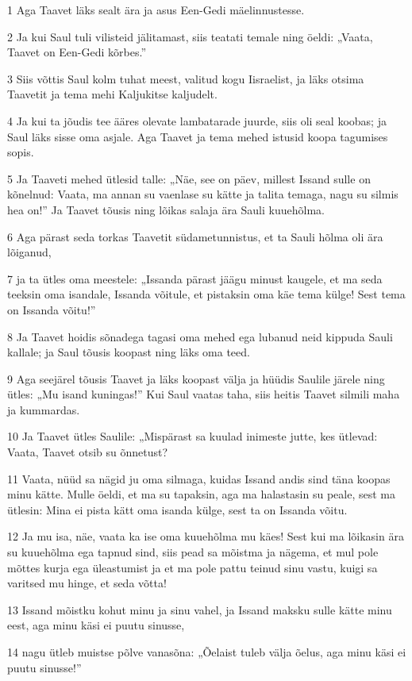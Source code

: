 \par 1 Aga Taavet läks sealt ära ja asus Een-Gedi mäelinnustesse.
\par 2 Ja kui Saul tuli vilisteid jälitamast, siis teatati temale ning öeldi: „Vaata, Taavet on Een-Gedi kõrbes.”
\par 3 Siis võttis Saul kolm tuhat meest, valitud kogu Iisraelist, ja läks otsima Taavetit ja tema mehi Kaljukitse kaljudelt.
\par 4 Ja kui ta jõudis tee ääres olevate lambatarade juurde, siis oli seal koobas; ja Saul läks sisse oma asjale. Aga Taavet ja tema mehed istusid koopa tagumises sopis.
\par 5 Ja Taaveti mehed ütlesid talle: „Näe, see on päev, millest Issand sulle on kõnelnud: Vaata, ma annan su vaenlase su kätte ja talita temaga, nagu su silmis hea on!” Ja Taavet tõusis ning lõikas salaja ära Sauli kuuehõlma.
\par 6 Aga pärast seda torkas Taavetit südametunnistus, et ta Sauli hõlma oli ära lõiganud,
\par 7 ja ta ütles oma meestele: „Issanda pärast jäägu minust kaugele, et ma seda teeksin oma isandale, Issanda võitule, et pistaksin oma käe tema külge! Sest tema on Issanda võitu!”
\par 8 Ja Taavet hoidis sõnadega tagasi oma mehed ega lubanud neid kippuda Sauli kallale; ja Saul tõusis koopast ning läks oma teed.
\par 9 Aga seejärel tõusis Taavet ja läks koopast välja ja hüüdis Saulile järele ning ütles: „Mu isand kuningas!” Kui Saul vaatas taha, siis heitis Taavet silmili maha ja kummardas.
\par 10 Ja Taavet ütles Saulile: „Mispärast sa kuulad inimeste jutte, kes ütlevad: Vaata, Taavet otsib su õnnetust?
\par 11 Vaata, nüüd sa nägid ju oma silmaga, kuidas Issand andis sind täna koopas minu kätte. Mulle öeldi, et ma su tapaksin, aga ma halastasin su peale, sest ma ütlesin: Mina ei pista kätt oma isanda külge, sest ta on Issanda võitu.
\par 12 Ja mu isa, näe, vaata ka ise oma kuuehõlma mu käes! Sest kui ma lõikasin ära su kuuehõlma ega tapnud sind, siis pead sa mõistma ja nägema, et mul pole mõttes kurja ega üleastumist ja et ma pole pattu teinud sinu vastu, kuigi sa varitsed mu hinge, et seda võtta!
\par 13 Issand mõistku kohut minu ja sinu vahel, ja Issand maksku sulle kätte minu eest, aga minu käsi ei puutu sinusse,
\par 14 nagu ütleb muistse põlve vanasõna: „Õelaist tuleb välja õelus, aga minu käsi ei puutu sinusse!”
